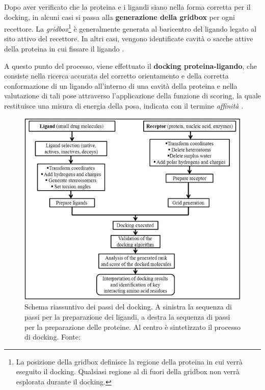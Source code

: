 Dopo aver verificato che la proteina e i ligandi siano nella forma corretta per il docking, in alcuni casi si passa alla \textbf{generazione della gridbox} per ogni recettore. La \textit{gridbox}\footnote{La posizione della gridbox definisce la regione della proteina in cui verrà eseguito il docking. Qualsiasi regione al di fuori della gridbox non verrà esplorata durante il docking.} è generalmente generata al baricentro del ligando legato al sito attivo del recettore. 
In altri casi, vengono identificate cavità o sacche attive della proteina in cui fissare il ligando \cite{roy_chapter_2015}.

A questo punto del processo, viene effettuato il \textbf{docking proteina-ligando}, che consiste nella ricerca accurata del corretto orientamento e della corretta conformazione di un ligando all'interno di una cavità della proteina e nella valutazione di tali pose attraverso l'applicazione della funzione di scoring, la quale restituisce una misura di energia della posa, indicata con il termine \textit{affinità} \cite{roy_chapter_2015}.

\begin{figure}[h]
    \centering
    \includegraphics[scale=0.7]{images/chapter1/docking_steps.jpg}
    \caption[Schema riassuntivo dei passi del docking.]{Schema riassuntivo dei passi del docking. A sinistra la sequenza di passi per la preparazione dei ligandi, a destra la sequenza di passi per la preparazione delle proteine. Al centro è sintetizzato il processo di docking. Fonte: \cite{roy_chapter_2015}}
    \label{fig:docking_steps}
\end{figure}

